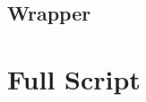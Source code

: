 \documentclass[letterpaper,11pt,english]{sphinxmanual}
\begin{document}
\subsection{ Wrapper}
\label{\detokenize{sphinx:makefile-wrapper}}
\begin{sphinxVerbatim}[commandchars=\\\{\}]
         
\end{sphinxVerbatim}


\section{Full  Script}
\label{\detokenize{sphinx:full-docgen-py-script}}
\end{document}
